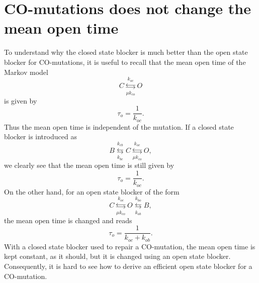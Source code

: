 





\section{CO-mutations does not change the mean open time}

To understand why the closed state blocker is much better than the open state blocker for CO-mutations, it is useful to recall that the mean open time of the Markov model
\begin{equation}
C\underset{\mu k_{co}}{\overset{k_{oc}}{\leftrightarrows}}O \label{Markov111}%
\end{equation}
is given by
\[ \tau_o=\frac{1}{k_{oc}}. \]
Thus the mean open time is independent of the mutation. If a closed state blocker is introduced as
\begin{equation}
B\underset{k_{bc}}{\overset{k_{cb}}{\leftrightarrows}}C\underset{\mu
k_{co}}{\overset{k_{oc}}{\leftrightarrows}}O, 
\end{equation}
we clearly see that the mean open time is still given by
\[ \tau_o=\frac{1}{k_{oc}}. \]
On the other hand, for an open state blocker of the form
\begin{equation}
C\underset{ \mu k_{co}}{\overset{k_{oc}}{\leftrightarrows}}O\underset{k_{ob}%
}{\overset{k_{bo}}{\leftrightarrows}}B,
\end{equation}
the mean open time is changed and reads
\[ \tau_o=\frac{1}{k_{oc}+k_{ob}}. \]
With a closed state blocker used to repair a CO-mutation, the mean open time is kept constant, as it should, but it is changed using an open state blocker. Consequently, it is hard to see how to derive an efficient open state blocker for a CO-mutation.

